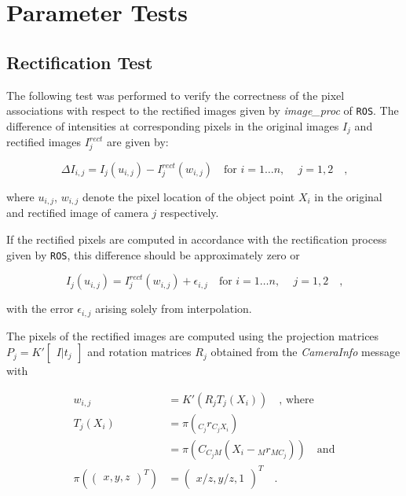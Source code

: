 \chapter{Parameter Tests}
\section{Rectification Test}

The following test was performed to verify the correctness of the pixel
associations with respect to the rectified images given by \textit{image\_proc}
of \texttt{ROS}.
The difference of intensities at corresponding pixels in the original images $I_{j}$ and rectified images $I_{j}^{rect}$ are given by:

\begin{equation}
  \Delta I_{i,j} = I_j(u_{i,j}) - I_j^{rect}(w_{i,j}) 
  \hspace{1em} \text{for } i = 1 \ldots n \text{, } \hspace{1em} j = 1,2
  \hspace{1em}\text{,}
  \label{eqn:rect/I_def}
\end{equation}

where $u_{i,j}$, $w_{i,j}$ denote the pixel location of the object point $X_i$ in the
original and rectified image of camera $j$ respectively.

If the rectified pixels are computed in accordance with the rectification
process given by \texttt{ROS}, this difference should be
approximately zero or

\begin{equation}
  I_j(u_{i,j}) = I_j^{rect}(w_{i,j}) + \epsilon_{i,j} 
  \hspace{1em} \text{for } i = 1 \ldots n \text{, } \hspace{1em} j = 1,2
  \hspace{1em}\text{,}
  \label{eqn:rect/diffI_eq}
\end{equation}

with the error $\epsilon_{i,j}$ arising solely from interpolation.

The pixels of the rectified images are computed using the projection matrices
$P_{j} = K' \begin{bmatrix} I | t_j \end{bmatrix}$ and rotation matrices $R_j$ 
obtained from the \textit{CameraInfo} message with \cite{WikiCameraInfo}

\begin{align}
  w_{i,j} &= K'(R_j T_j(X_i)) \hspace{1em} \text{, where} \\
  T_j(X_i) &= \pi(_{C_j}r_{C_jX_i}) \\
           &= \pi(C_{C_j M} (X_i - {_M}r_{MC_j})) \hspace{1em} \text{and} \\
  \pi(\begin{pmatrix} x, y, z \end{pmatrix}^T) &= 
  \begin{pmatrix} x/z, y/z, 1 \end{pmatrix}^T 
  \hspace{1em}\text{.}
  \label{eqn:rect/utilde_def}
\end{align}

